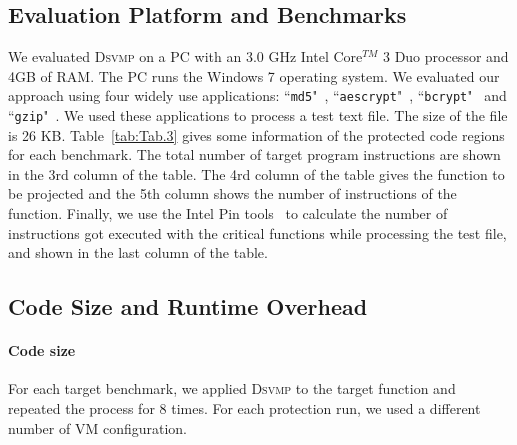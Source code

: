 \documentclass[preprint,12pt,3p]{elsarticle}
\newcommand{\DSVMP}{\textsc{Dsvmp }}
\begin{document}
\subsection{Evaluation Platform and Benchmarks}
We evaluated \DSVMP on a PC with an 3.0 GHz Intel Core$^{TM}$ 3 Duo processor and 4GB of RAM.
The PC runs the Windows 7 operating system. We evaluated our approach using four widely use applications: ``\texttt{md5}"~\cite{19md5}, ``\texttt{aescrypt}"~\cite{20Aescrypt}, ``\texttt{bcrypt}"~\cite{21bcrypt} and ``\texttt{gzip}"~\cite{22gzip}.
We used these applications to process a test text file. The size of the file is 26 KB.
Table~\ref{tab:Tab.3} gives some information of the protected code regions for each benchmark.
The total number of target program instructions are shown in the 3rd column of the table.
The 4rd column of the table gives the function to be projected
and the 5th column shows the number of instructions of the function.
Finally, we use the Intel Pin tools~\cite{pin} to calculate the number of instructions got executed with the critical functions
while processing the test file, and shown in the last column of the table.


\subsection{Code Size and Runtime Overhead}
\paragraph*{Code size} For each target benchmark, we applied \DSVMP to the target function and repeated the process for 8 times.
For each protection run, we used a different number of VM configuration.
\end{document}
